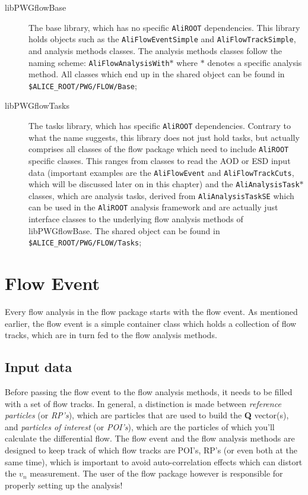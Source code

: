 \documentclass[a4paper]{book}
\numberwithin{equation}{subsection}
\begin{document}
\begin{description}
    \item [libPWGflowBase] The base library, which has no specific \texttt{AliROOT} dependencies. This library holds objects such as the \texttt{AliFlowEventSimple} and \texttt{AliFlowTrackSimple}, and analysis methods classes. The analysis methods classes follow the naming scheme: \texttt{AliFlowAnalysisWith$\ast$} where $\ast$ denotes a specific analysis method. All classes which end up in the  shared object can be found in \texttt{\$ALICE\_ROOT/PWG/FLOW/Base};
    \item [libPWGflowTasks]  The tasks library, which has specific \texttt{AliROOT} dependencies. Contrary to what the name suggests, this library does not just hold tasks, but actually comprises all classes of the flow package which need to include \texttt{AliROOT} specific classes. This ranges from classes to read the AOD or ESD input data (important examples are the \texttt{AliFlowEvent} and \texttt{AliFlowTrackCuts}, which will be discussed later on in this chapter) and the \texttt{AliAnalysisTask$\ast$} classes, which are analysis tasks, derived from \texttt{AliAnalysisTaskSE} which can be used in the \texttt{AliROOT} analysis framework and are actually just interface classes to the underlying flow analysis methods of libPWGflowBase. The  shared object can be found in \texttt{\$ALICE\_ROOT/PWG/FLOW/Tasks};
\end{description}


\section{Flow Event}
Every flow analysis in the flow package starts with the flow event. As mentioned earlier, the flow event is a simple container class which holds a collection of flow tracks, which are in turn fed to the flow analysis methods. 
\subsection{Input data}
Before passing the flow event to the flow analysis methods, it needs to be filled with a set of flow tracks. In general, a distinction is made between \emph{reference particles} (or \emph{RP's}), which are particles that are used to build the \textbf{Q} vector(s), and \emph{particles of interest} (or \emph{POI's}), which are the particles of which you'll calculate the differential flow. The flow event and the flow analysis methods are designed to keep track of which flow tracks are POI's, RP's (or even both at the same time), which is important to avoid auto-correlation effects which can distort the $v_n$ measurement. The user of the flow package however is responsible for properly setting up the analysis! 
\end{document}
